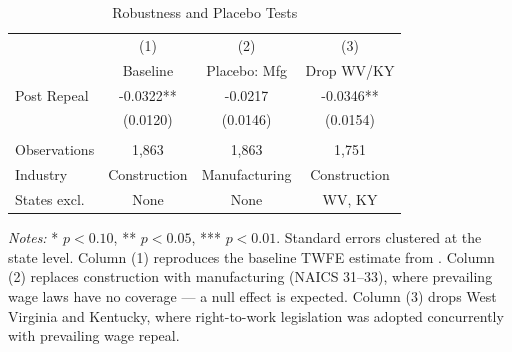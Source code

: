 \begin{table}[H]
\centering
\caption{Robustness and Placebo Tests}
\label{tab:robust}
\begin{threeparttable}
\begin{tabular}{lccc}
\toprule
 & (1) & (2) & (3) \\
 & Baseline & Placebo: Mfg & Drop WV/KY \\
\midrule
Post Repeal & -0.0322** & -0.0217 & -0.0346** \\
 & (0.0120) & (0.0146) & (0.0154) \\
\\
Observations & 1,863 & 1,863 & 1,751 \\
Industry & Construction & Manufacturing & Construction \\
States excl. & None & None & WV, KY \\
\bottomrule
\end{tabular}
\begin{tablenotes}[flushleft]
\small
\item \textit{Notes:} * $p<0.10$, ** $p<0.05$, *** $p<0.01$. Standard errors clustered at the state level. Column (1) reproduces the baseline TWFE estimate from . Column (2) replaces construction with manufacturing (NAICS 31--33), where prevailing wage laws have no coverage --- a null effect is expected. Column (3) drops West Virginia and Kentucky, where right-to-work legislation was adopted concurrently with prevailing wage repeal.
\end{tablenotes}
\end{threeparttable}
\end{table}
